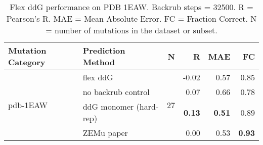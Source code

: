 \begin{table}
  \begin{tabular}{llrrrr}
\toprule
Mutation Category &       Prediction Method &   N &     R &  MAE &   FC \\
\midrule
 \multirow{ 4}{*}{pdb-1EAW} & flex ddG & \multirow{ 4}{*}{27} & -0.02 & 0.57 & 0.85  \\
 & no backrub control & & 0.07 & 0.66 & 0.78  \\
 & ddG monomer (hard-rep) & & \textbf{0.13} & \textbf{0.51} & 0.89  \\
 & ZEMu paper & & 0.00 & 0.53 & \textbf{0.93}  \\
\bottomrule
\end{tabular}
  \caption[Flex ddG performance on PDB 1EAW]{
    Flex ddG performance on PDB 1EAW. Backrub steps = 32500. R = Pearson's R. MAE = Mean Absolute Error. FC = Fraction Correct. N = number of mutations in the dataset or subset.
  } \label{tab:table-pdb-1EAW}
\end{table}
